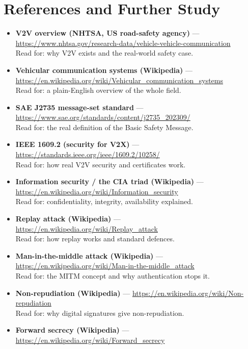 \documentclass[11pt,a4paper]{report}
\begin{document}
\section{References and Further Study}
\begin{itemize}
  \item \textbf{V2V overview (NHTSA, US road-safety agency)} ---
        \url{https://www.nhtsa.gov/research-data/vehicle-vehicle-communication}\\
        Read for: why V2V exists and the real-world safety case.
  \item \textbf{Vehicular communication systems (Wikipedia)} ---
        \url{https://en.wikipedia.org/wiki/Vehicular_communication_systems}\\
        Read for: a plain-English overview of the whole field.
  \item \textbf{SAE J2735 message-set standard} ---
        \url{https://www.sae.org/standards/content/j2735_202309/}\\
        Read for: the real definition of the Basic Safety Message.
  \item \textbf{IEEE 1609.2 (security for V2X)} ---
        \url{https://standards.ieee.org/ieee/1609.2/10258/}\\
        Read for: how real V2V security and certificates work.
  \item \textbf{Information security / the CIA triad (Wikipedia)} ---
        \url{https://en.wikipedia.org/wiki/Information_security}\\
        Read for: confidentiality, integrity, availability explained.
  \item \textbf{Replay attack (Wikipedia)} ---
        \url{https://en.wikipedia.org/wiki/Replay_attack}\\
        Read for: how replay works and standard defences.
  \item \textbf{Man-in-the-middle attack (Wikipedia)} ---
        \url{https://en.wikipedia.org/wiki/Man-in-the-middle_attack}\\
        Read for: the MITM concept and why authentication stops it.
  \item \textbf{Non-repudiation (Wikipedia)} ---
        \url{https://en.wikipedia.org/wiki/Non-repudiation}\\
        Read for: why digital signatures give non-repudiation.
  \item \textbf{Forward secrecy (Wikipedia)} ---
        \url{https://en.wikipedia.org/wiki/Forward_secrecy}\\

\end{itemize}
\end{document}
